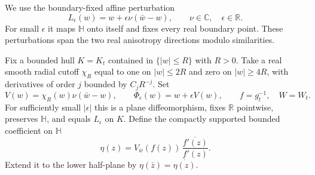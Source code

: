 \documentclass[11pt]{article}
\theoremstyle{definition}\newtheorem{definition}[theorem]{Definition}
\theoremstyle{remark}\newtheorem{remark}[theorem]{Remark}
\begin{document}
We use the boundary-fixed affine perturbation
\[
 L_\epsilon(w)=w+\epsilon\nu(\bar w-w),\qquad \nu\in\mathbb C,
 \quad \epsilon\in\mathbb R.
 \tag{AV1}
\]
For small $\epsilon$ it maps $\mathbb H$ onto itself and fixes every
real boundary point. These perturbations span the two real anisotropy
directions modulo similarities.

Fix a bounded hull $K=K_t$ contained in $\{|w|\le R\}$ with $R>0$.
Take a real smooth radial cutoff $\chi_R$ equal to one on $|w|\le2R$
and zero on $|w|\ge4R$, with derivatives of order $j$ bounded by
$C_jR^{-j}$. Set
\[
 V(w)=\chi_R(w)\nu(\bar w-w),\qquad
 \Phi_\epsilon(w)=w+\epsilon V(w),\qquad f=g_t^{-1},\quad W=W_t.
 \tag{AV2}
\]
For sufficiently small $|\epsilon|$ this is a plane diffeomorphism,
fixes $\mathbb R$ pointwise, preserves $\mathbb H$, and equals
$L_\epsilon$ on $K$. Define the compactly supported bounded coefficient
on $\mathbb H$
\[
 \eta(z)=V_{\bar w}(f(z))\,
                \frac{\overline{f'(z)}}{f'(z)}.
 \tag{AV3}
\]
Extend it to the lower half-plane by
$\eta(\bar z)=\overline{\eta(z)}$.
\end{document}
